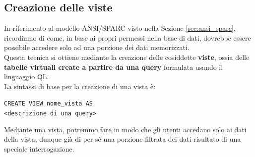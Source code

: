 \documentclass[12pt]{report}
\begin{document}
	\subsection{Creazione delle viste}
	In riferimento al modello ANSI/SPARC visto nella Sezione \ref{sec:ansi_sparc}, ricordiamo di come, in base ai propri permessi nella base di dati, dovrebbe essere possibile accedere solo ad una porzione dei dati memorizzati.\\
	Questa tecnica si ottiene mediante la creazione delle cosiddette \textbf{viste}, ossia delle \textbf{tabelle virtuali create a partire da una query} formulata usando il linguaggio QL.\\
	La sintassi di base per la creazione di una vista è:
	\begin{center}
		\texttt{CREATE VIEW nome\_vista AS}\\
		\texttt{<descrizione di una query>}
	\end{center}
	Mediante una vista, potremmo fare in modo che gli utenti accedano solo ai dati della vista, dunque già di per sé una porzione filtrata dei dati risultato di una speciale interrogazione.
	
\end{document}
